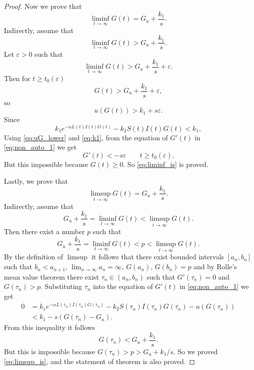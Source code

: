 \documentclass[pdflatex,sn-mathphys-num]{sn-jnl}
\theoremstyle{thmstyleone}
\theoremstyle{thmstyletwo}
\theoremstyle{thmstylethree}
\begin{document}
\begin{proof}
Now we prove that
\begin{equation}\label{eq:liminf_is}
\liminf_{t\to\infty}G(t)= G_u+\frac{k_1}{s}.
\end{equation}
Indirectly, assume that
\begin{equation}
\liminf_{t\to\infty}G(t)> G_u+\frac{k_1}{s}.
\end{equation}
Let $\varepsilon>0$ such that 
\begin{equation*}
\liminf_{t\to\infty}G(t)>G_u+\frac{k_1}{s}+\varepsilon.
\end{equation*}
Then for $t\geq t_0(\varepsilon)$ 
\begin{equation*}
G(t)>G_u+\frac{k_1}{s}+\varepsilon,
\end{equation*}
so
\begin{equation}\label{eq:uG_lower}
u(G(t))>k_1+s\varepsilon.
\end{equation}
Since 
\begin{equation}\label{eq:k1}
k_1e^{-\alpha L(t)I(t)G(t)}-k_2S(t)I(t)G(t)<k_1,
\end{equation}
Using \eqref{eq:uG_lower} and \eqref{eq:k1}, from the equation of 
$G'(t)$ in \eqref{eq:non_auto_1} we get
\begin{equation*}
G'(t)< -s\varepsilon\qquad t\geq t_0(\varepsilon).
\end{equation*}
But this impossible because $G(t)\geq 0$. So \eqref{eq:liminf_is} 
is proved.

Lastly, we prove that
\begin{equation}\label{eq:limsup_is}
\limsup_{t\to\infty}G(t)= G_u+\frac{k_1}{s}.
\end{equation}
Indirectly, assume that 
\begin{equation}
G_u+\frac{k_1}{s}=\liminf_{t\to\infty}G(t)<\limsup_{t\to\infty}G(t).
\end{equation}
Then there exist a number $p$ such that
\begin{equation}
G_u+\frac{k_1}{s}=\liminf_{t\to\infty}G(t)<p<
\limsup_{t\to\infty}G(t).
\end{equation}
By the definition of $\limsup$ it follows that there exist bounded intervals 
$[a_n,b_n]$ such that $b_n<a_{n+1}$, 
$\displaystyle{\lim_{n\to\infty}}a_n=\infty$, $G(a_n),\,G(b_n)=p$ and 
by Rolle's mean value theorem there 
exist $\tau_n\in (a_n,b_n)$ such that $G'(\tau_n)=0$ and 
$G(\tau_n)>p$. 
Substituting $\tau_n$ into the equation of $G'(t)$ in 
\eqref{eq:non_auto_1} we get  
\begin{align}\label{eq:limsup_tau}
0&=k_1e^{-\alpha L(\tau_n)I(\tau_n)G(\tau_n)}-
k_2S(\tau_n)I(\tau_n)G(\tau_n)-u(G(\tau_n))\\
&< k_1-s(G(\tau_n)-G_u).\nonumber
\end{align}
From this inequality it follows
\begin{equation*}
G(\tau_n)<G_u+\frac{k_1}{s}.
\end{equation*}
But this is impossible because $G(\tau_n)>p>G_u+k_1/s$. So we proved 
 \eqref{eq:limsup_is}, and the statement of theorem is also proved. 
\end{proof}
\end{document}
